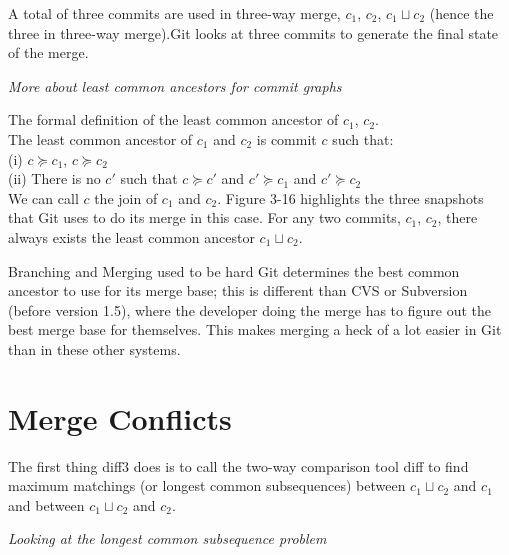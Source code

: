 A total of three commits are used in three-way merge, $c_1$, $c_2$, 
$c_1 \sqcup c_2$ (hence the three in three-way merge).Git looks at three
 commits to generate the final state of the merge. 

\frmrule

\begin{example}


\end{example}

\frmrule

\textit{More about least common ancestors for commit graphs}

The formal definition of the least common ancestor of $c_1$, $c_2$.\\
The least common ancestor of $c_1$ and $c_2$ is commit $c$ such that: \\
(i) $c \succeq c_1$, $c \succeq c_2$ \\
(ii) There is no $c'$ such that $c \succeq c'$ and $c' \succeq c_1$ and $c' \succeq c_2$ \\

We can call $c$ the join of $c_1$ and $c_2$. 
Figure 3-16 highlights the three snapshots that Git uses to do its merge in this case. 
For any two commits, $c_1$, $c_2$, there always exists the least common ancestor 
$c_1 \sqcup c_2$. 

\begin{sidenote}{Branching and Merging  used to be hard}
Git determines the best common ancestor to use for its merge base;
this is different than CVS or Subversion (before version 1.5),
where the developer doing the merge has to figure out the best merge base for
themselves. This makes merging a heck of a lot easier in Git than in these other systems.
\end{sidenote}

\section{Merge Conflicts}



\frmrule 

The first thing diff3 does is to call the two-way comparison tool diff to
find maximum matchings (or longest common subsequences) between $c_1 \sqcup c_2$ and $c_1$
and between $c_1 \sqcup c_2$ and $c_2$.

\frmrule 

\textit{Looking at the longest common subsequence problem}

